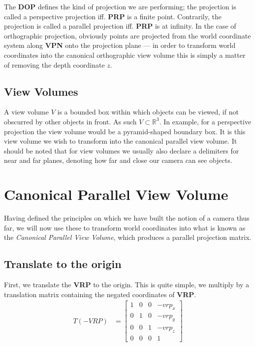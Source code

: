 \documentclass[11pt]{article}
\begin{document}
The {\bf DOP} defines the kind of projection we are performing; the projection
is called a perspective projection iff. {\bf PRP} is a finite point.
Contrarily, the projection is called a parallel projection iff. {\bf PRP} is
at infinity. In the case of orthographic projection, obviously points are
projected from the world coordinate system along {\bf VPN} onto the projection
plane --- in order to transform world coordinates into the canonical
orthographic view volume this is simply a matter of removing the depth
coordinate $z$.

\subsection{View Volumes}
\label{sec:intro|sub:view-volumes}
A view volume $V$ is a bounded box within which objects can be viewed, if not
obscurred by other objects in front. As such $V \subset \mathbb{R}^3$. In
example, for a perspective projection the view volume would be a
pyramid-shaped boundary box. It is this view volume we wish to transform into
the canonical parallel view volume. It should be noted that for view volumes
we usually also declare a delimiters for near and far planes, denoting how far
and close our camera can see objects.

\section{Canonical Parallel View Volume}
\label{sec:canonical-parallel-view-volume}
Having defined the principles on which we have built the notion of a camera
thus far, we will now use these to transform world coordinates into what is
known as the {\it Canonical Parallel View Volume}, which produces a parallel
projection matrix.

\subsection{Translate to the origin}
\label{sec:canonical-parallel-view-volume|sub:translate-to-origin}
First, we translate the {\bf VRP} to the origin. This is quite simple, we
multiply by a translation matrix containing the negated coordinates of
{\bf VRP}.
\begin{align}
    T(-VRP) &=
    \begin{bmatrix}
        1 & 0 & 0 & -vrp_x \\
        0 & 1 & 0 & -vrp_y \\
        0 & 0 & 1 & -vrp_z \\
        0 & 0 & 0 & 1
    \end{bmatrix}
\end{align}
\end{document}
